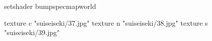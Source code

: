 setshader bumpspecmapworld

    texture c "suiseiseki/37.jpg"
    texture n "suiseiseki/38.jpg"
    texture s "suiseiseki/39.jpg"

